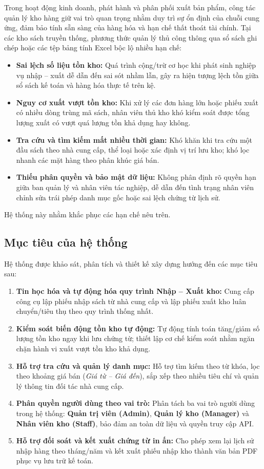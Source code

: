 \documentclass[12pt,a4paper]{article}
\begin{document}
Trong hoạt động kinh doanh, phát hành và phân phối xuất bản phẩm, công tác quản lý kho hàng giữ vai trò quan trọng nhằm duy trì sự ổn định của chuỗi cung ứng, đảm bảo tính sẵn sàng của hàng hóa và hạn chế thất thoát tài chính. Tại các kho sách truyền thống, phương thức quản lý thủ công thông qua sổ sách ghi chép hoặc các tệp bảng tính Excel bộc lộ nhiều hạn chế:
\begin{itemize}
    \item \textbf{Sai lệch số liệu tồn kho:} Quá trình cộng/trừ cơ học khi phát sinh nghiệp vụ nhập – xuất dễ dẫn đến sai sót nhầm lẫn, gây ra hiện tượng lệch tồn giữa sổ sách kế toán và hàng hóa thực tế trên kệ.
    \item \textbf{Nguy cơ xuất vượt tồn kho:} Khi xử lý các đơn hàng lớn hoặc phiếu xuất có nhiều dòng trùng mã sách, nhân viên thủ kho khó kiểm soát được tổng lượng xuất có vượt quá lượng tồn khả dụng hay không.
    \item \textbf{Tra cứu và tìm kiếm mất nhiều thời gian:} Khó khăn khi tra cứu một đầu sách theo nhà cung cấp, thể loại hoặc xác định vị trí lưu kho; khó lọc nhanh các mặt hàng theo phân khúc giá bán.
    \item \textbf{Thiếu phân quyền và bảo mật dữ liệu:} Không phân định rõ quyền hạn giữa ban quản lý và nhân viên tác nghiệp, dễ dẫn đến tình trạng nhân viên chỉnh sửa trái phép danh mục gốc hoặc sai lệch chứng từ lịch sử.
\end{itemize}

Hệ thống này nhằm khắc phục các hạn chế nêu trên.

\subsection{Mục tiêu của hệ thống}
\label{subsec:muc-tieu}

Hệ thống được khảo sát, phân tích và thiết kế xây dựng hướng đến các mục tiêu sau:
\begin{enumerate}
    \item \textbf{Tin học hóa và tự động hóa quy trình Nhập – Xuất kho:} Cung cấp công cụ lập phiếu nhập sách từ nhà cung cấp và lập phiếu xuất kho luân chuyển/tiêu thụ theo quy trình thống nhất.
    \item \textbf{Kiểm soát biến động tồn kho tự động:} Tự động tính toán tăng/giảm số lượng tồn kho ngay khi lưu chứng từ; thiết lập cơ chế kiểm soát nhằm ngăn chặn hành vi xuất vượt tồn kho khả dụng.
    \item \textbf{Hỗ trợ tra cứu và quản lý danh mục:} Hỗ trợ tìm kiếm theo từ khóa, lọc theo khoảng giá bán (\textit{Giá từ -- Giá đến}), sắp xếp theo nhiều tiêu chí và quản lý thông tin đối tác nhà cung cấp.
    \item \textbf{Phân quyền người dùng theo vai trò:} Phân tách ba vai trò người dùng trong hệ thống: \textbf{Quản trị viên (Admin)}, \textbf{Quản lý kho (Manager)} và \textbf{Nhân viên kho (Staff)}, bảo đảm an toàn dữ liệu và quyền truy cập API.
    \item \textbf{Hỗ trợ đối soát và kết xuất chứng từ in ấn:} Cho phép xem lại lịch sử nhập hàng theo tháng/năm và kết xuất phiếu nhập kho thành văn bản PDF phục vụ lưu trữ kế toán.
\end{enumerate}
\end{document}
